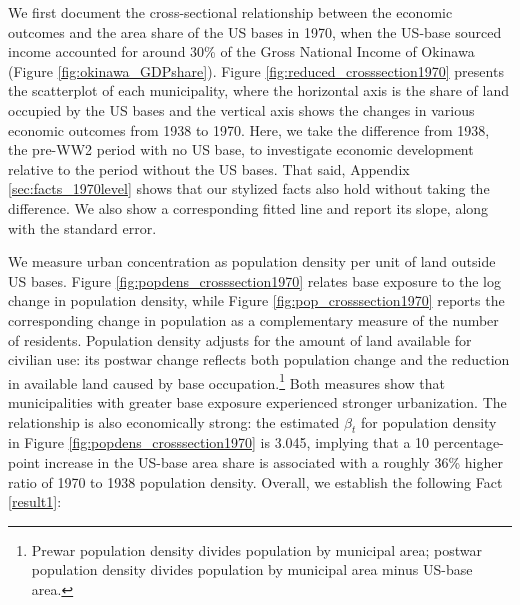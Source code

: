 \documentclass[12pt, unicode, a4paper]{article}
\newcommand{\1}{\mbox{1}\hspace{-0.25em}\mbox{l}} %
\begin{document}
We first document the cross-sectional relationship between the economic outcomes and the area share of the US bases in 1970, when the US-base sourced income accounted for around 30\% of the Gross National Income of Okinawa (Figure \ref{fig:okinawa_GDPshare}). 
Figure \ref{fig:reduced_crosssection1970} presents the scatterplot of each municipality, where the horizontal axis is the share of land occupied by the US bases and the vertical axis shows the changes in various economic outcomes from 1938 to 1970.
Here, we take the difference from 1938, the pre-WW2 period with no US base, to investigate economic development relative to the period without the US bases. That said, Appendix \ref{sec:facts_1970level} shows that our stylized facts also hold without taking the difference.
We also show a corresponding fitted line and report its slope, along with the standard error.


We measure urban concentration as population density per unit of land outside US bases. Figure \ref{fig:popdens_crosssection1970} relates base exposure to the log change in population density, while Figure \ref{fig:pop_crosssection1970} reports the corresponding change in population as a complementary measure of the number of residents. Population density adjusts for the amount of land available for civilian use: its postwar change reflects both population change and the reduction in available land caused by base occupation.\footnote{Prewar population density divides population by municipal area; postwar population density divides population by municipal area minus US-base area. } Both measures show that municipalities with greater base exposure experienced stronger urbanization.
The relationship is also economically strong: the estimated $\beta_t$ for population density in Figure \ref{fig:popdens_crosssection1970} is 3.045, implying that a 10 percentage-point increase in the US-base area share is associated with a roughly 36\% higher ratio of 1970 to 1938 population density.  Overall, we establish the following Fact \ref{result1}: 
\end{document}

